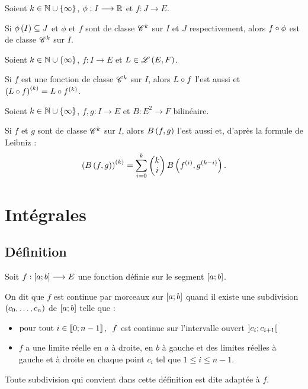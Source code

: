 \begin{prop}
Soient \(k\in\N\union\accol{\infty}\), \(\phi:I\to\R\) et \(f:J\to E\).

Si \(\phi\paren{I}\subset J\) et \(\phi\) et \(f\) sont de classe \(\classe{k}\) sur \(I\) et \(J\) respectivement, alors \(f\rond\phi\) est de classe \(\classe{k}\) sur \(I\).
\end{prop}

\begin{prop}
Soient \(k\in\N\union\accol{\infty}\), \(f:I\to E\) et \(L\in\L{E}{F}\).

Si \(f\) est une fonction de classe \(\classe{k}\) sur \(I\), alors \(L\rond f\) l'est aussi et \(\paren{L\rond f}\deriv{k}=L\rond f\deriv{k}\).
\end{prop}

\begin{prop}
Soient \(k\in\N\union\accol{\infty}\), \(f,g:I\to E\) et \(B:E^2\to F\) bilinéaire.

Si \(f\) et \(g\) sont de classe \(\classe{k}\) sur \(I\), alors \(B\paren{f,g}\) l'est aussi et, d'après la formule de Leibniz : \[\paren{B\paren{f,g}}\deriv{k}=\sum_{i=0}^k\binom{i}{k}B\paren{f\deriv{i},g\deriv{k-i}}.\]
\end{prop}

\section{Intégrales}

\subsection{Définition}

\begin{defi}
Soit \(f:\intervii{a}{b}\to E\) une fonction définie sur le segment \(\intervii{a}{b}\).

On dit que \(f\) est continue par morceaux sur \(\intervii{a}{b}\) quand il existe une subdivision \(\paren{c_0,\dots,c_n}\) de \(\intervii{a}{b}\) telle que :

\begin{itemize}
    \item \(\quantifs{\tpt i\in\interventierii{0}{n-1}}f\) est continue sur l'intervalle ouvert \(\intervee{c_i}{c_{i+1}}\) \\
    \item \(f\) a une limite réelle en \(a\) à droite, en \(b\) à gauche et des limites réelles à gauche et à droite en chaque point \(c_i\) tel que \(1\leq i\leq n-1\).
\end{itemize}

Toute subdivision qui convient dans cette définition est dite adaptée à \(f\).
\end{defi}


